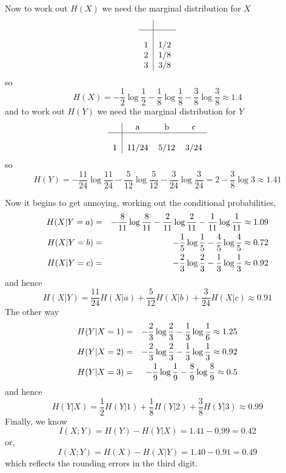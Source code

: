 \documentclass[12pt]{article}
\begin{document}
\begin{enumerate}
Now to work out $H(X)$ we need the marginal distribution for $X$
\begin{equation}
\begin{tabular}{c|c}
&\\
\hline\\
1&1/2\\
2&1/8\\
3&3/8
\end{tabular}
\end{equation}
so 
\begin{equation}
H(X)=-\frac{1}{2}\log{\frac{1}{2}}-\frac{1}{8}\log{\frac{1}{8}}-\frac{3}{8}\log{\frac{3}{8}}\approx 1.4
\end{equation}
and to work out $H(Y)$ we need the marginal distribution for $Y$
\begin{equation}
\begin{tabular}{c|ccc}
&a&b&c\\
\hline\\
1&11/24&5/12&3/24
\end{tabular}
\end{equation}
so
\begin{equation}
H(Y)=-\frac{11}{24}\log{\frac{11}{24}}-\frac{5}{12}\log{\frac{5}{12}}-\frac{3}{24}\log{\frac{3}{24}}=2-\frac{3}{8}\log{3}\approx 1.41
\end{equation}

Now it begins to get annoying, working out the conditional probabilities, 
\begin{eqnarray}
H(X|Y=a)&=&-\frac{8}{11}\log{\frac{8}{11}}-\frac{2}{11}\log{\frac{2}{11}}-\frac{1}{11}\log{\frac{1}{11}}\approx 1.09\cr
H(X|Y=b)&=&-\frac{1}{5}\log{\frac{1}{5}}-\frac{4}{5}\log{\frac{4}{5}}\approx 0.72\cr
H(X|Y=c)&=&-\frac{2}{3}\log{\frac{2}{3}}-\frac{1}{3}\log{\frac{1}{3}}\approx 0.92
\end{eqnarray}
and hence
\begin{equation}
H(X|Y)=\frac{11}{24}H(X|a)+\frac{5}{12}H(X|b)+\frac{3}{24}H(X|c)\approx 0.91
\end{equation}
The other way
\begin{eqnarray}
H(Y|X=1)&=&-\frac{2}{3}\log{\frac{2}{3}}-\frac{1}{3}\log{\frac{1}{6}}\approx 1.25\cr
H(Y|X=2)&=&-\frac{2}{3}\log{\frac{2}{3}}-\frac{1}{3}\log{\frac{1}{3}}\approx 0.92\cr
H(Y|X=3)&=&-\frac{1}{9}\log{\frac{1}{9}}-\frac{8}{9}\log{\frac{8}{9}}\approx 0.5
\end{eqnarray}
and hence
\begin{equation}
H(Y|X)=\frac{1}{2}H(Y|1)+\frac{1}{8}H(Y|2)+\frac{3}{8}H(Y|3)\approx 0.99
\end{equation}
Finally, we know 
\begin{equation}
I(X;Y)=H(Y)-H(Y|X)=1.41-0.99=0.42
\end{equation}
or,
\begin{equation}
I(X;Y)=H(X)-H(X|Y)=1.40-0.91=0.49
\end{equation}
which reflects the rounding errors in the third digit.



\end{enumerate}
\end{document}
